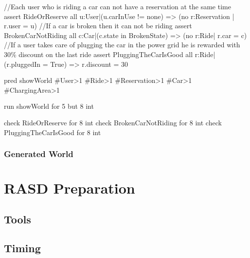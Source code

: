 \documentclass[11pt,a4paper]{report}
\begin{document}
\begin{alloyCode}
//Each user who is riding a car can not have a reservation at the same time
assert RideOrReserve{
	all u:User|(u.carInUse != none) => (no r:Reservation | r.user = u)
}
//If a car is broken then it can not be riding
assert BrokenCarNotRiding{
	all c:Car|(c.state in BrokenState) => (no r:Ride| r.car = c)
}
//If a user takes care of plugging the car in the power grid he is rewarded with 30\% discount on the last ride
assert PluggingTheCarIsGood{
	all r:Ride|(r.pluggedIn = True) => r.discount = 30
}


pred showWorld{
	#User>1
	#Ride>1
	#Reservation>1
	#Car>1
	#ChargingArea>1
}

run showWorld for 5 but 8 int

check RideOrReserve for 8 int
check BrokenCarNotRiding for 8 int
check PluggingTheCarIsGood for 8 int

\end{alloyCode} 
\subsection{Generated World}
\chapter{RASD Preparation}
\section{Tools}
\section{Timing}
\end{document}

